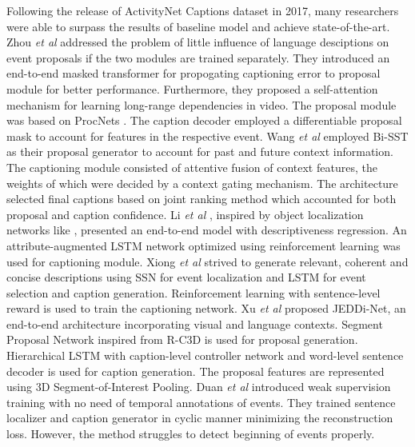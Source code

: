 \par Following the release of ActivityNet Captions dataset in 2017, many researchers were able to surpass the results of baseline model and achieve state-of-the-art. Zhou \textit{et al} \cite{zhou2018end} addressed the problem of little influence of language desciptions on event proposals if the two modules are trained separately. They introduced an end-to-end masked transformer for propogating captioning error to proposal module for better performance. Furthermore, they proposed a self-attention mechanism for learning long-range dependencies in video. The proposal module was based on ProcNets \cite{zhou2017automatic}. The caption decoder employed a differentiable proposal mask to account for features in the respective event. Wang \textit{et al} \cite{wang2018bidirectional} employed Bi-SST as their proposal generator to account for past and future context information. The captioning module consisted of attentive fusion of context features, the weights of which were decided by a context gating mechanism. The architecture selected final captions based on joint ranking method which accounted for both proposal and caption confidence. Li \textit{et al} \cite{li2018jointly}, inspired by object localization networks like \cite{ren2016faster, liu2016ssd}, presented an end-to-end model with descriptiveness regression. An attribute-augmented LSTM network optimized using reinforcement learning was used for captioning module. Xiong \textit{et al} \cite{xiong2018forward} strived to generate relevant, coherent and concise descriptions using SSN \cite{zhao2017temporal} for event localization and LSTM for event selection and caption generation. Reinforcement learning with sentence-level reward is used to train the captioning network. Xu \textit{et al} \cite{xu2018joint} proposed JEDDi-Net, an end-to-end architecture incorporating visual and language contexts. Segment Proposal Network inspired from R-C3D \cite{xu2017rc3d} is used for proposal generation. Hierarchical LSTM with caption-level controller network and word-level sentence decoder is used for caption generation. The proposal features are represented using 3D Segment-of-Interest Pooling. Duan \textit{et al} \cite{duan2018weakly} introduced weak supervision training with no need of temporal annotations of events. They trained sentence localizer and caption generator in cyclic manner minimizing the reconstruction loss. However, the method struggles to detect beginning of events properly.

